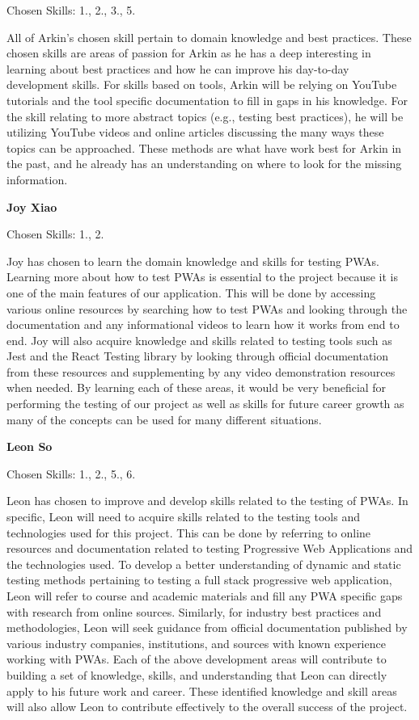 \documentclass[12pt, titlepage]{article}
\begin{document}
\begin{enumerate}
	      Chosen Skills: 1., 2., 3., 5.

	      All of Arkin's chosen skill pertain to domain knowledge and best practices. These chosen skills are
	      areas of passion for Arkin as he has a deep interesting in learning about best practices and how he
	      can improve his day-to-day development skills. For skills based on tools, Arkin will be relying on
	      YouTube tutorials and the tool specific documentation to fill in gaps in his knowledge. For the
	      skill relating to more abstract topics (e.g., testing best practices), he will be utilizing YouTube
	      videos and online articles discussing the many ways these topics can be approached. These methods
	      are what have work best for Arkin in the past, and he already has an understanding on where to look
	      for the missing information.

	      \textbf{Joy Xiao}

	      Chosen Skills: 1., 2.

	      Joy has chosen to learn the domain knowledge and skills for testing PWAs. Learning more about how
	      to test PWAs is essential to the project because it is one of the main features of our application.
	      This will be done by accessing various online resources by searching how to test PWAs and looking
	      through the documentation and any informational videos to learn how it works from end to end. Joy
	      will also acquire knowledge and skills related to testing tools such as Jest and the React Testing
	      library by looking through official documentation from these resources and supplementing by any
	      video demonstration resources when needed. By learning each of these areas, it would be very
	      beneficial for performing the testing of our project as well as skills for future career growth as
	      many of the concepts can be used for many different situations.

	      \textbf{Leon So}

	      Chosen Skills: 1., 2., 5., 6.

	      Leon has chosen to improve and develop skills related to the testing of PWAs. In specific, Leon
	      will need to acquire skills related to the testing tools and technologies used for this project.
	      This can be done by referring to online resources and documentation related to testing Progressive
	      Web Applications and the technologies used. To develop a better understanding of dynamic and static
	      testing methods pertaining to testing a full stack progressive web application, Leon will refer to
	      course and academic materials and fill any PWA specific gaps with research from online sources.
	      Similarly, for industry best practices and methodologies, Leon will seek guidance from official
	      documentation published by various industry companies, institutions, and sources with known
	      experience working with PWAs. Each of the above development areas will contribute to building a set
	      of knowledge, skills, and understanding that Leon can directly apply to his future work and career.
	      These identified knowledge and skill areas will also allow Leon to contribute effectively to the
	      overall success of the project.


\end{enumerate}
\end{document}
